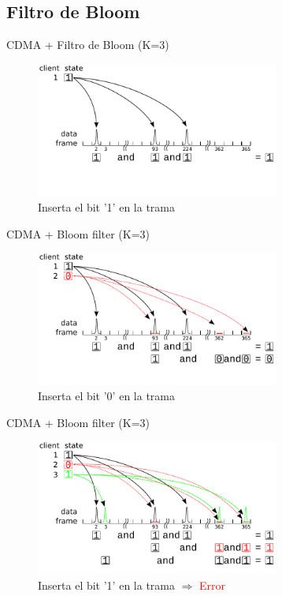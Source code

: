 \documentclass[aspectratio=169]{beamer}
\begin{document}
\subsection{Filtro de Bloom}

\begin{frame}{CDMA + Filtro de Bloom (K=3)}
\begin{figure}[t]
  \centering
    \includegraphics[width=8cm]{graphs/z_bloom1.pdf}
    \\ \huge Inserta el bit '1' en la trama
\end{figure}
\end{frame}
\begin{frame}{CDMA + Bloom filter (K=3)}
\begin{figure}[t]
  \centering
    \includegraphics[width=8cm]{graphs/z_bloom2.pdf}
    \\ \huge Inserta el bit '0' en la trama
\end{figure}
\end{frame}
\begin{frame}{CDMA + Bloom filter (K=3)}
\begin{figure}[t]
  \centering
    \includegraphics[width=8cm]{graphs/z_bloom3.pdf}
    \\ \huge Inserta el bit '1' en la trama $\Rightarrow$ \textcolor{red}{Error}
\end{figure}
\end{frame}
\end{document}
